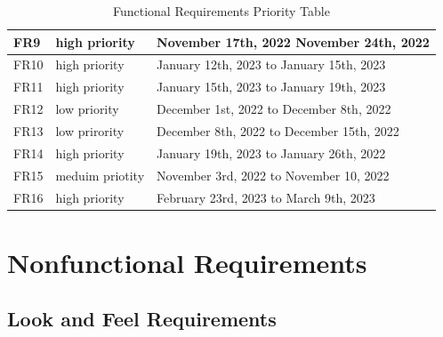 \documentclass{article}
\begin{document}
\begin{table}[H]
\begin{tabular}{|lll|}
\multicolumn{1}{|l|}{FR9}                                                               & \multicolumn{1}{l|}{high priority}   & November 17th, 2022 November 24th, 2022    \\ \hline
\multicolumn{1}{|l|}{FR10}                                                              & \multicolumn{1}{l|}{high priority}   & January 12th, 2023 to January 15th, 2023   \\ \hline
\multicolumn{1}{|l|}{FR11}                                                              & \multicolumn{1}{l|}{high priority}   & January 15th, 2023 to January 19th, 2023   \\ \hline
\multicolumn{1}{|l|}{FR12}                                                              & \multicolumn{1}{l|}{low priority}    & December 1st, 2022 to December 8th, 2022   \\ \hline
\multicolumn{1}{|l|}{FR13}                                                              & \multicolumn{1}{l|}{low prirority}   & December 8th, 2022 to December 15th, 2022  \\ \hline
\multicolumn{1}{|l|}{FR14}                                                              & \multicolumn{1}{l|}{high priority}   & January 19th, 2023 to January 26th, 2022   \\ \hline
\multicolumn{1}{|l|}{FR15}                                                              & \multicolumn{1}{l|}{meduim priotity} & November 3rd, 2022 to November 10, 2022    \\ \hline
\multicolumn{1}{|l|}{FR16}                                                              & \multicolumn{1}{l|}{high priority}   & February 23rd, 2023 to March 9th, 2023     \\ \hline
\end{tabular}
\caption{Functional Requirements Priority Table}
\end{table}


\newpage

\section{Nonfunctional Requirements}
\subsection{Look and Feel Requirements}
\end{document}

